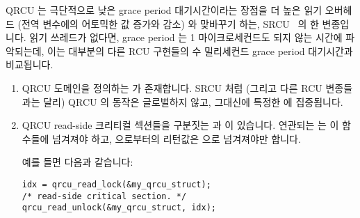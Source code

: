 QRCU 는 극단적으로 낮은 grace period 대기시간이라는 장점을 더 높은 읽기
오버헤드 (전역 변수에의 어토믹한 값 증가와 감소) 와 맞바꾸기 하는,
SRCU~\cite{PaulEMcKenney2006c} 의 한 변종입니다.
읽기 쓰레드가 없다면, grace period 는 1 마이크로세컨드도 되지 않는 시간에
파악되는데, 이는 대부분의 다른 RCU 구현들의 수 밀리세컨드 grace period
대기시간과 비교됩니다.
\iffalse

QRCU is a variant of SRCU~\cite{PaulEMcKenney2006c}
that trades somewhat higher read overhead
(atomic increment and decrement on a global variable) for extremely
low grace-period latencies.
If there are no readers, the grace period will be detected in less
than a microsecond, compared to the multi-millisecond grace-period
latencies of most other RCU implementations.
\fi

\begin{enumerate}
\item	QRCU 도메인을 정의하는  가 존재합니다.
	SRCU 처럼 (그리고 다른 RCU 변종들과는 달리) QRCU 의 동작은 글로벌하지
	않고, 그대신에 특정한  에 집중됩니다.
\item	QRCU read-side 크리티컬 섹션들을 구분짓는  과
	 이 있습니다.
	연관되는  는 이 함수들에 넘겨져야 하고,
	 으로부터의 리턴값은  으로
	넘겨져야만 합니다.

	예를 들면 다음과 같습니다:
\iffalse

\item	There is a \co{qrcu_struct} that defines a QRCU domain.
	Like SRCU (and unlike other variants of RCU) QRCU's action
	is not global, but instead focused on the specified
	\co{qrcu_struct}.
\item	There are \co{qrcu_read_lock()} and \co{qrcu_read_unlock()}
	primitives that delimit QRCU read-side critical sections.
	The corresponding \co{qrcu_struct} must be passed into
	these primitives, and the return value from \co{rcu_read_lock()}
	must be passed to \co{rcu_read_unlock()}.

	For example:
\fi

\vspace{5pt}
\begin{minipage}[t]{\columnwidth}
\scriptsize
\begin{verbatim}
idx = qrcu_read_lock(&my_qrcu_struct);
/* read-side critical section. */
qrcu_read_unlock(&my_qrcu_struct, idx);
\end{verbatim}
\end{minipage}
\vspace{5pt}


\end{enumerate}
